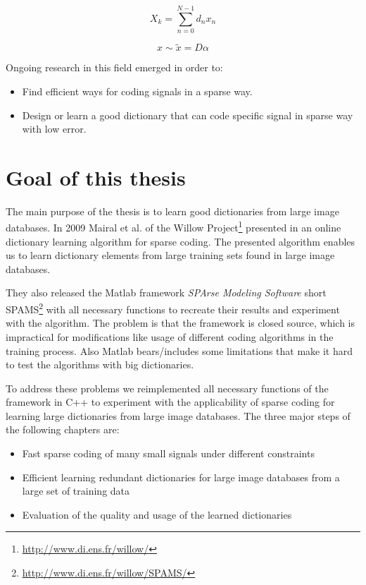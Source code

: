 \Todo{	}
\begin{equation}
X_k = \sum_{n=0}^{N-1}d_nx_n
\end{equation}

\begin{equation}
 x \sim \tilde{x} = D\alpha
\end{equation}



Ongoing research in this field emerged in order to:
\begin{itemize}
 \item Find efficient ways for coding signals in a sparse way.
 \item Design or learn a good dictionary that can code specific signal in sparse
way with low error.
\end{itemize}


\section{Goal of this thesis}
The main purpose of the thesis is to learn good dictionaries from large
image databases. %
In 2009 Mairal et al. of the Willow
Project\footnote{\url{http://www.di.ens.fr/willow/}} presented in
\cite{Mairal2009,Mairal2010} an online dictionary learning algorithm for sparse
coding. The presented algorithm enables us to learn dictionary elements from
large training sets found in large image databases.

They also released the Matlab framework \emph{SPArse Modeling Software}
short SPAMS\footnote{\url{http://www.di.ens.fr/willow/SPAMS/}} with all
necessary functions to recreate their results and experiment with the algorithm.
The problem is that the framework is closed source, which is impractical for
modifications like usage of different coding algorithms in the training process.
Also Matlab bears/includes some limitations that make it hard to test the
algorithms with big dictionaries.

To address these problems we reimplemented all necessary functions of the
framework in C++ to experiment with the applicability of sparse coding for
learning large dictionaries from large image databases. The three major steps of
the following chapters are:

\begin{itemize}
 \item Fast sparse coding of many small signals under different constraints
 \item Efficient learning redundant dictionaries for large image databases from
a large set of training data
 \item Evaluation of the quality and usage of the learned dictionaries
\end{itemize}

